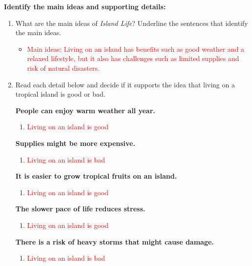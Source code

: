 \documentclass[12pt]{article}
\begin{document}
\begin{tcolorbox}[colframe=black!60, colback=white, 
coltitle=black, colbacktitle=black!15, fonttitle=\bfseries\Large, 
title=Guided Practice, halign title=center, left=10pt, right=10pt, top=10pt, bottom=15pt]
\textbf{Identify the main ideas and supporting details:}
\begin{enumerate}[itemsep=2em]
    \item What are the main ideas of \textit{Island Life}? Underline the sentences that identify the main ideas.
    \begin{itemize}
        \item \textcolor{red}{Main ideas: Living on an island has benefits such as good weather and a relaxed lifestyle, but it also has challenges such as limited supplies and risk of natural disasters.}
    \end{itemize}
    
    \item Read each detail below and decide if it supports the idea that living on a tropical island is good or bad.

    \textbf{People can enjoy warm weather all year.}  
    \begin{enumerate}
        \item \textcolor{red}{Living on an island is good}
    \end{enumerate}

    \textbf{Supplies might be more expensive.}  
    \begin{enumerate}
        \item \textcolor{red}{Living on an island is bad}
    \end{enumerate}

    \textbf{It is easier to grow tropical fruits on an island.}  
    \begin{enumerate}
        \item \textcolor{red}{Living on an island is good}
    \end{enumerate}

    \textbf{The slower pace of life reduces stress.}  
    \begin{enumerate}
        \item \textcolor{red}{Living on an island is good}
    \end{enumerate}

    \textbf{There is a risk of heavy storms that might cause damage.}  
    \begin{enumerate}
        \item \textcolor{red}{Living on an island is bad}
    \end{enumerate}
\end{enumerate}
\end{tcolorbox}
\end{document}
